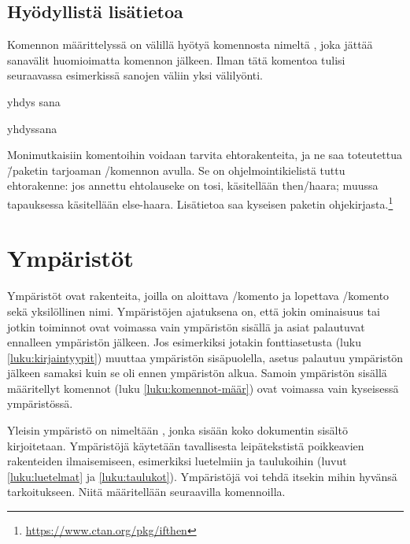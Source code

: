 \subsection{Hyödyllistä lisätietoa}
\label{luku:komennot-lisä}

Komennon määrittelyssä on välillä hyötyä komennosta nimeltä , joka jättää sanavälit huomioimatta komennon jälkeen.
Ilman tätä komentoa tulisi seuraavassa esimerkissä sanojen väliin yksi
välilyönti.

\begin{koodilohkosis}
  \newcommand{\komento}[1]{#1\ignorespaces}
  \komento{yhdys}       sana
\end{koodilohkosis}

\begin{tulossis}
  yhdyssana
\end{tulossis}

Monimutkaisiin komentoihin voidaan tarvita ehtorakenteita, ja ne saa
toteutettua \=/paketin tarjoaman \-/komennon avulla. Se on ohjelmointikielistä tuttu
ehtorakenne: jos annettu ehtolauseke on tosi, käsitellään then\-/haara;
muussa tapauksessa käsitellään else-haara. Lisätietoa saa kyseisen
paketin ohjekirjasta.\footnote{\url{https://www.ctan.org/pkg/ifthen}}

\section{Ympäristöt}

Ympäristöt ovat rakenteita, joilla on aloittava \-/komento ja lopettava \-/komento sekä
yksilöllinen nimi. Ympäristöjen ajatuksena on, että jokin ominaisuus tai
jotkin toiminnot ovat voimassa vain ympäristön sisällä ja asiat
palautuvat ennalleen ympäristön jälkeen. Jos esimerkiksi jotakin
fontti\-asetusta (luku \ref{luku:kirjaintyypit}) muuttaa ympäristön
sisäpuolella, asetus palautuu ympäristön jälkeen samaksi kuin se oli
ennen ympäristön alkua. Samoin ympäristön sisällä määritellyt komennot
(luku \ref{luku:komennot-määr}) ovat voimassa vain kyseisessä
ympäristössä.

\begin{koodilohkosis}
  \begin{nimi}
  \end{nimi}
\end{koodilohkosis}

Yleisin ympäristö on nimeltään , jonka sisään koko
dokumentin sisältö kirjoitetaan. Ympäristöjä käytetään tavallisesta
leipätekstistä poikkeavien rakenteiden ilmaisemiseen, esimerkiksi
luetelmiin ja taulukoihin (luvut \ref{luku:luetelmat} ja
\ref{luku:taulukot}). Ympäristöjä voi tehdä itsekin mihin hyvänsä
tarkoitukseen. Niitä määritellään seuraavilla komennoilla.

